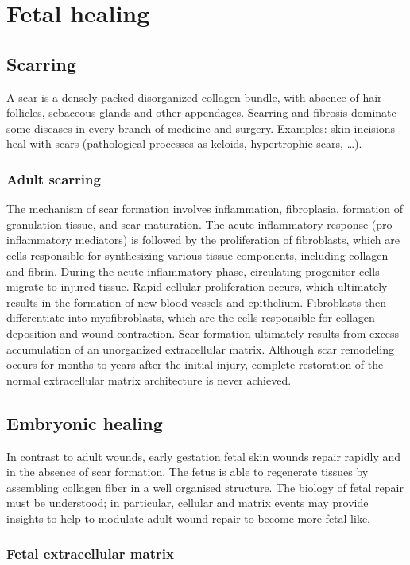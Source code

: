 \graphicspath{{chapters/scarring/}}
\chapter{Fetal healing}

\section{Scarring}
A scar is a densely packed disorganized collagen bundle, with absence of hair follicles, sebaceous glands and other appendages. 
Scarring and fibrosis dominate some diseases in every branch of medicine and surgery.
Examples: skin incisions heal with scars (pathological processes as keloids, hypertrophic scars, …).

\subsection{Adult scarring}
The mechanism of scar formation involves inflammation, fibroplasia, formation of granulation tissue, and scar maturation.  The acute inflammatory response (pro inflammatory mediators) is followed by the proliferation of fibroblasts, which are cells responsible for synthesizing various tissue components, including collagen and fibrin. During the acute inflammatory phase, circulating progenitor cells migrate to injured tissue. Rapid cellular proliferation occurs, which ultimately results in the formation of new blood vessels and epithelium. Fibroblasts then differentiate into myofibroblasts, which are the cells responsible for collagen deposition and wound contraction. Scar formation ultimately results from excess accumulation of an unorganized extracellular matrix. Although scar remodeling occurs for months to years after the initial injury, complete restoration of the normal extracellular matrix architecture is never achieved. 

\section{Embryonic healing}
In contrast to adult wounds, early gestation fetal skin wounds repair rapidly and in the absence of scar formation. 
The fetus is able to regenerate tissues by assembling collagen fiber in a well organised structure.
The biology of fetal repair must be understood; in particular, cellular and matrix events may provide insights to help to modulate adult wound repair to become more fetal-like.

\subsection{Fetal extracellular matrix}

